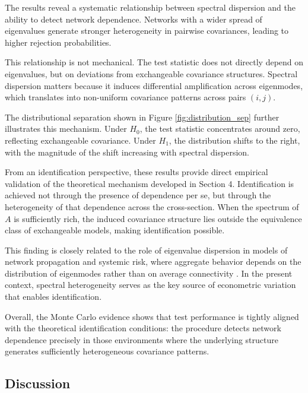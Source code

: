 \documentclass[12pt]{article}
\numberwithin{equation}{section}
\begin{document}
The results reveal a systematic relationship between spectral dispersion and the ability to detect network dependence. Networks with a wider spread of eigenvalues generate stronger heterogeneity in pairwise covariances, leading to higher rejection probabilities.

This relationship is not mechanical. The test statistic does not directly depend on eigenvalues, but on deviations from exchangeable covariance structures. Spectral dispersion matters because it induces differential amplification across eigenmodes, which translates into non-uniform covariance patterns across pairs $(i,j)$.

The distributional separation shown in Figure \ref{fig:distribution_sep} further illustrates this mechanism. Under $H_0$, the test statistic concentrates around zero, reflecting exchangeable covariance. Under $H_1$, the distribution shifts to the right, with the magnitude of the shift increasing with spectral dispersion.

From an identification perspective, these results provide direct empirical validation of the theoretical mechanism developed in Section 4. Identification is achieved not through the presence of dependence per se, but through the heterogeneity of that dependence across the cross-section. When the spectrum of $A$ is sufficiently rich, the induced covariance structure lies outside the equivalence class of exchangeable models, making identification possible.

This finding is closely related to the role of eigenvalue dispersion in models of network propagation and systemic risk, where aggregate behavior depends on the distribution of eigenmodes rather than on average connectivity \citep{acemoglu2015systemic, elliott2014financial}. In the present context, spectral heterogeneity serves as the key source of econometric variation that enables identification.

Overall, the Monte Carlo evidence shows that test performance is tightly aligned with the theoretical identification conditions: the procedure detects network dependence precisely in those environments where the underlying structure generates sufficiently heterogeneous covariance patterns.

\subsection{Discussion}
\end{document}
